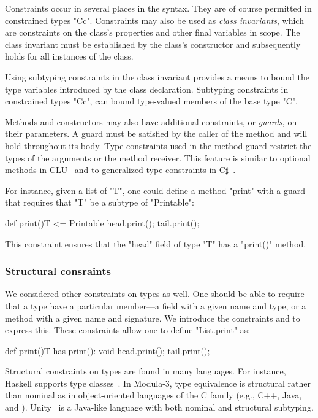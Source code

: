 Constraints occur in several places in the \Xten syntax.  They
are of course permitted in constrained types \xcd"C{c}".
Constraints may also be used as \emph{class invariants}, 
which are constraints on the class's properties and other
final variables in scope.
The class invariant must be established by the class's
constructor and subsequently holds for all instances of the
class.

Using subtyping constraints in the class invariant provides a
means to bound the type variables introduced by the class
declaration.  Subtyping constraints in constrained types
\xcd"C{c}", can bound
type-valued members of the base type \xcd"C".

Methods and constructors
may also have additional
constraints, or \emph{guards}, on their parameters.  A
guard must be satisfied by the caller of the method and
will hold throughout its body.  Type constraints used in the
method guard restrict the types of the arguments or the method
receiver.  
This feature is similar to optional methods in CLU~\cite{clu} and to generalized type constraints in C$\sharp$~\cite{emir06}.


For instance, given a list of \xcd"T", one could define a
method \xcd"print" with a guard that requires that \xcd"T" be a
subtype of \xcd"Printable":
\begin{xtenmathnoindent}
  def print(){T <= Printable} {
    head.print();
    tail.print();
  }
\end{xtenmathnoindent}
This constraint ensures that the \xcd"head" field of type
\xcd"T" has a \xcd"print()" method.

\subsubsection{Structural consraints}
We considered other constraints on types as well.
One should
be able to require that a type have a
particular member---a field with a given name and type, or a method
with a given name and signature.
We introduce the constraints 
   and  
 to express this.
These
constraints allow one to define \xcd"List.print" as:
\begin{xtenmathnoindent}
  def print(){T has print(): void} {
    head.print();
    tail.print();
  }
\end{xtenmathnoindent}

Structural constraints on types are found in many languages.
For instance,
Haskell supports type
classes~\cite{haskell,haskell-type-classes}.
%
In Modula-3, type equivalence is structural
rather than nominal as in object-oriented languages of the C
family (e.g., C++, Java, and \Xten{}).
Unity~\cite{malayeriIntegrating08}
is a Java-like language with both nominal and structural subtyping.

